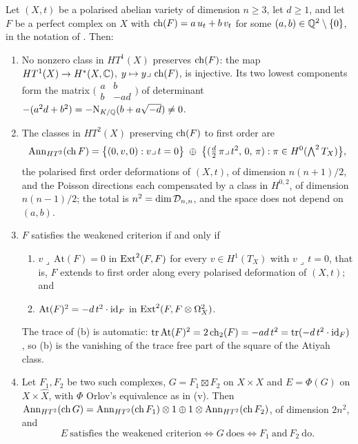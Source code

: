 \begin{theorem}\label{thm:factor}
Let $(X,t)$ be a polarised abelian variety of dimension $n\ge3$, let $d\ge1$,
and let $F$ be a perfect complex on $X$ with
$\operatorname{ch}(F)=a\,u_{t}+b\,v_{t}$ for some $(a,b)\in\mathbb{Q}^{2}\setminus\{0\}$, in the
notation of \cite[(30)]{paperI}. Then:
\begin{enumerate}[label=\textup{(\roman*)},nosep]
\item No nonzero class in $HT^{1}(X)$ preserves $\operatorname{ch}(F)$: the map
  $HT^{1}(X)\to H^{*}(X,\mathbb{C})$, $y\mapsto y\lrcorner\,\operatorname{ch}(F)$, is injective. Its
  two lowest components form the matrix
  $\bigl(\begin{smallmatrix}a&b\\ b&-ad\end{smallmatrix}\bigr)$ of
  determinant $-(a^{2}d+b^{2})=-\mathrm{N}_{K/\mathbb{Q}}(b+a\sqrt{-d})\ne0$.
\item The classes in $HT^{2}(X)$ preserving $\operatorname{ch}(F)$ to first order are
  \begin{equation}\label{eq:secantkernel}
    \operatorname{Ann}_{HT^{2}}(\operatorname{ch} F)
    =\bigl\{(0,v,0):v\lrcorner\,t=0\bigr\}\;\oplus\;
     \bigl\{(\tfrac d2\,\pi\lrcorner\,t^{2},\,0,\,\pi):
       \pi\in H^{0}(\textstyle\bigwedge^{2}T_{X})\bigr\},
  \end{equation}
  the polarised first order deformations of $(X,t)$, of dimension $n(n+1)/2$,
  and the Poisson directions each compensated by a class in $H^{0,2}$, of
  dimension $n(n-1)/2$; the total is $n^{2}=\dim\mathcal{D}_{n,n}$, and the space
  does not depend on $(a,b)$.
\item $F$ satisfies the weakened criterion if and only if
  \begin{enumerate}[label=\textup{(\alph*)},nosep]
  \item $v\lrcorner\,\mathrm{At}(F)=0$ in $\operatorname{Ext}^{2}(F,F)$ for every
    $v\in H^{1}(T_{X})$ with $v\lrcorner\,t=0$, that is, $F$ extends to first
    order along every polarised deformation of $(X,t)$; and
  \item $\mathrm{At}(F)^{2}=-d\,t^{2}\cdot\operatorname{id}_{F}$ in
    $\operatorname{Ext}^{2}(F,F\otimes\Omega^{2}_{X})$.
  \end{enumerate}
  The trace of (b) is automatic: $\operatorname{tr}\mathrm{At}(F)^{2}
  =2\operatorname{ch}_{2}(F)=-ad\,t^{2}=\operatorname{tr}(-d\,t^{2}\cdot\operatorname{id}_{F})$, so (b)
  is the vanishing of the trace free part of the square of the Atiyah class.
\item Let $F_{1},F_{2}$ be two such complexes, $G=F_{1}\boxtimes F_{2}$ on
  $X\times X$ and $E=\Phi(G)$ on $X\times\widehat X$, with $\Phi$ Orlov's
  equivalence as in (v). Then
  $\operatorname{Ann}_{HT^{2}}(\operatorname{ch} G)=\operatorname{Ann}_{HT^{2}}(\operatorname{ch} F_{1})\otimes1\oplus
  1\otimes\operatorname{Ann}_{HT^{2}}(\operatorname{ch} F_{2})$, of dimension $2n^{2}$, and
  \[
    E\ \text{satisfies the weakened criterion}
    \iff G\ \text{does}
    \iff F_{1}\ \text{and}\ F_{2}\ \text{do}.
  \]
\end{enumerate}
\end{theorem}

